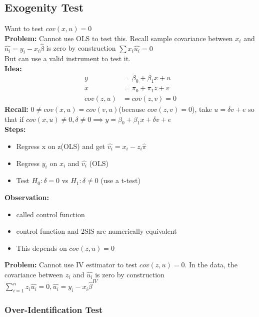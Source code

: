 \documentclass{article}
\theoremstyle{definition}
\theoremstyle{thrm}
\theoremstyle{lma}
\theoremstyle{ppst}
\theoremstyle{crlr}
\begin{document}
\subsection{Exogenity Test}
Want to test $cov(x,u)=0$\\
\textbf{Problem: }Cannot use OLS to test this. Recall sample covariance between $x_i$ and $\hat{u_i} = y_i - x_i\hat{\beta}$ is zero by construction $\sum x_i\hat{u_i} = 0$\\
But can use a valid instrument to test it. \\
\textbf{Idea:}
\begin{align*}
	y &= \beta_0+\beta_1x+u\\
	x &= \pi_0+\pi_1z +v\\
	cov(z,u) &= cov(z,v) = 0
\end{align*}
\textbf{Recall: }$0 \neq cov(x,u) = cov(v,u)$(because $cov(z,v)=0$), take $u = \delta v+e$ so that if $cov(x,u)\neq 0, \delta\neq 0\implies y = \beta_0+\beta_1x+\delta v +e $\\
\textbf{Steps: }
\begin{itemize}
	\item Regress x on z(OLS) and get $\hat{v_i} = x_i-z_i\hat{\pi}$
	\item Regress $y_i$ on $x_i$ and $\hat{v_i}$ (OLS)
	\item Test $H_0: \delta=0$ vs $H_1: \delta\neq 0$ (use a t-test) 
\end{itemize}
\textbf{Observation: }
\begin{itemize}
	\item called control function
	\item control function and 2SlS are numerically equivalent
	\item This depends on $cov(z,u)=0$
\end{itemize}
\textbf{Problem: } Cannot use IV estimator to test $cov(z,u) =0$. In the data, the covariance between $z_i$ and $\hat{u_i} $ is zero by construction $\sum_{i=1}^nz_i\hat{u_i}=0, \hat{u_i} = y_i-x_i\hat{\beta}^{IV}$

\subsubsection{Over-Identification Test}
\end{document}
